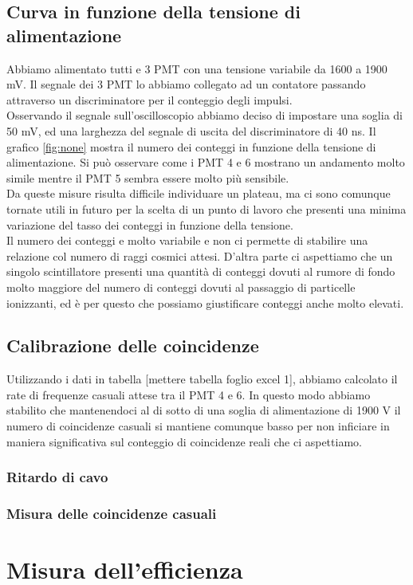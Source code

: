 \documentclass[a4paper,10pt]{article}
\begin{document}
\subsection{Curva in funzione della tensione di alimentazione}
Abbiamo alimentato tutti e 3 PMT con una tensione variabile da 1600 a 1900 mV. Il segnale dei 3 PMT lo abbiamo collegato ad un contatore passando attraverso un discriminatore per il conteggio degli impulsi.\\
Osservando il segnale sull'oscilloscopio abbiamo deciso di impostare una soglia di 50 mV, ed una larghezza del segnale di uscita del discriminatore di 40 ns. 
Il grafico \ref{fig:none} mostra il numero dei conteggi in funzione della tensione di alimentazione. Si può osservare come i PMT 4 e 6 mostrano un andamento molto simile mentre il PMT 5 sembra essere molto più sensibile.
\\
Da queste misure risulta difficile individuare un plateau, ma ci sono comunque tornate utili in futuro per la scelta di un punto di lavoro che presenti una minima variazione del tasso dei conteggi in funzione della tensione.
\\
Il numero dei conteggi e molto variabile e non ci permette di stabilire una relazione col numero di raggi cosmici attesi. D'altra parte ci aspettiamo che un singolo scintillatore presenti una quantità di conteggi dovuti al rumore di fondo molto maggiore del numero di conteggi dovuti al passaggio di particelle ionizzanti, ed è per questo che possiamo giustificare conteggi anche molto elevati.

\subsection{Calibrazione delle coincidenze}
Utilizzando i dati in tabella [mettere tabella foglio excel 1], abbiamo calcolato il rate di frequenze casuali attese tra il PMT 4 e 6. In questo modo abbiamo stabilito che mantenendoci al di sotto di una soglia di alimentazione di 1900 V il numero di coincidenze casuali si mantiene comunque basso per non inficiare in maniera significativa sul conteggio di coincidenze reali che ci aspettiamo.

\subsubsection{Ritardo di cavo}

\subsubsection{Misura delle coincidenze casuali}


\section{Misura dell'efficienza}
\label{sec:efficienza} 



\end{document}
